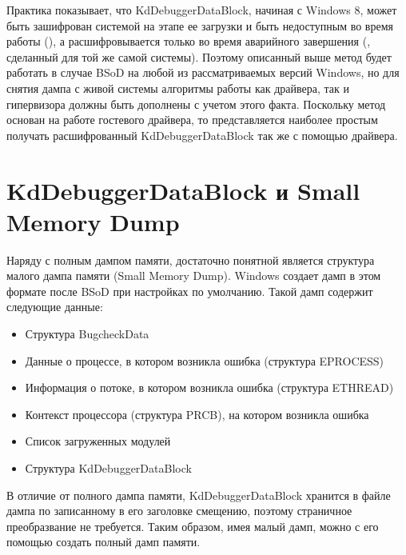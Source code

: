 \documentclass{mipt-thesis-bs}
\begin{document}
Практика показывает, что KdDebuggerDataBlock, начиная с Windows 8, может быть зашифрован системой на этапе ее загрузки и быть недоступным во время работы (), а расшифровывается только во время аварийного завершения (, сделанный для той же самой системы). Поэтому описанный выше метод будет работать в случае BSoD на любой из рассматриваемых версий Windows, но для снятия дампа с живой системы алгоритмы работы как драйвера, так и гипервизора должны быть дополнены с учетом этого факта. Поскольку метод основан на работе гостевого драйвера, то представляется наиболее простым получать расшифрованный KdDebuggerDataBlock так же с помощью драйвера.

\section*{KdDebuggerDataBlock и Small Memory Dump}

Наряду с полным дампом памяти, достаточно понятной является структура малого дампа памяти (Small Memory Dump). Windows создает дамп в этом формате после BSoD при настройках по умолчанию. Такой дамп содержит следующие данные:

\begin{itemize}
    \item Структура BugcheckData
    \item Данные о процессе, в котором возникла ошибка (структура EPROCESS)
    \item Информация о потоке, в котором возникла ошибка (структура ETHREAD)
    \item Контекст процессора (структура PRCB), на котором возникла ошибка
    \item Список загруженных модулей
    \item Структура KdDebuggerDataBlock
\end{itemize}

В отличие от полного дампа памяти, KdDebuggerDataBlock хранится в файле дампа по записанному в его заголовке смещению, поэтому страничное преобразвание не требуется. Таким образом, имея малый дамп, можно с его помощью создать полный дамп памяти.
\end{document}
